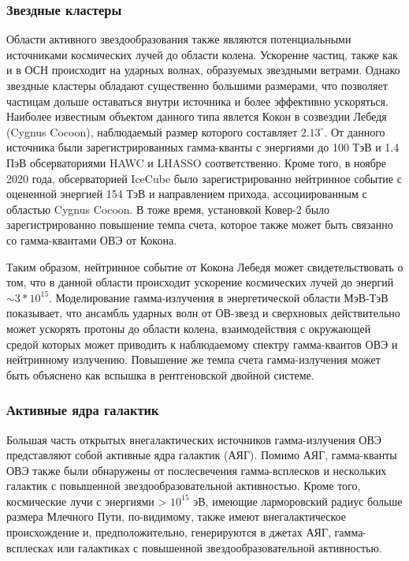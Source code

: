 \subsubsection{Звездные кластеры}
Области активного звездообразования также являются потенциальными источниками космических лучей до области колена. Ускорение частиц, также как и в ОСН происходит на ударных волнах, образуемых звездными ветрами. Однако звездные кластеры обладают существенно большими размерами, что позволяет частицам дольше оставаться внутри источника и более эффективно ускоряться. Наиболее известным объектом данного типа явлется Кокон в созвездии Лебедя (Cygnus Cocoon), наблюдаемый размер которого составляет $2.13^\circ$. От данного источника были зарегистрированных гамма-кванты с энергиями до 100 ТэВ и 1.4 ПэВ обсерваториями HAWC\cite{HAWC_COCOON} и LHASSO\cite{LHASSO_NATURE} соответственно. Кроме того, в ноябре 2020 года, обсерваторией IceCube было зарегистрированно нейтринное событие с оцененной энергией 154 ТэВ и направлением прихода, ассоциированным с областью Cygnus Cocoon\cite{IceCube_Cocoon_2020}. В тоже время, установкой Ковер-2 было зарегистрированно повышение темпа счета, которое также может быть связанно со гамма-квантами ОВЭ от Кокона\cite{Dzhappuev_2021}. 

Таким образом, нейтринное событие от Кокона Лебедя может свидетельствовать о том, что в данной области происходит ускорение космических лучей до энергий $\sim3*10^{15}$. Моделирование гамма-излучения в энергетической области МэВ-ТэВ показывает, что ансамбль ударных волн от ОВ-звезд и сверхновых действительно может ускорять протоны до области колена, взаимодействия с окружающей средой которых может приводить к наблюдаемому спектру гамма-квантов ОВЭ и нейтринному излучению\cite{Bykov_2022}. Повышение же темпа счета гамма-излучения может быть объяснено как вспышка в рентгеновской двойной системе\cite{Bykov_2021}.

\subsubsection{Активные ядра галактик}
Большая часть открытых внегалактических источников гамма-излучения ОВЭ представляют собой активные ядра галактик (АЯГ). Помимо АЯГ, гамма-кванты ОВЭ также были обнаружены от послесвечения гамма-всплесков и нескольких галактик с повышенной звездообразовательной активностью. Кроме того, космические лучи с энергиями > $10^{15}$ эВ, имеющие ларморовский радиус больше размера Млечного Пути, по-видимому, также имеют внегалактическое происхождение и, предположительно, генерируются в джетах АЯГ, гамма-всплесках или галактиках с повышенной звездообразовательной активностью.

